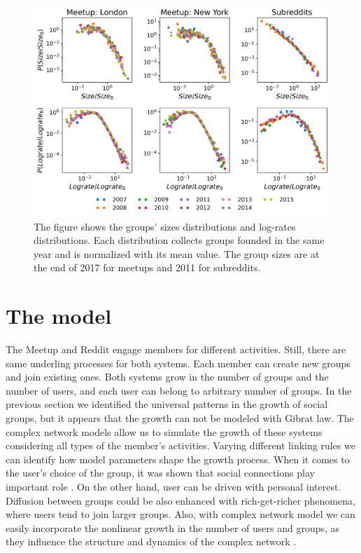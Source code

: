 \begin{figure}[h]
	\centering
	\includegraphics[width=0.8\linewidth]{Figures/figures/Fig1.png}
	\caption{The figure shows the groups' sizes distributions and log-rates distributions. Each distribution collects groups founded in the same year and is normalized with its mean value. The group sizes are at the end of 2017 for meetups and 2011 for subreddits.}
	\label{fig:scale}
\end{figure}

\section{The model}

The Meetup and Reddit engage members for different activities. Still, there are same underling processes for both systems. Each member can create new groups and join existing ones. Both systems grow in the number of groups and the number of users, and each user can belong to arbitrary number of groups. In the previous section we identified the universal patterns in the growth of social groups, but it appears that the growth can not be modeled with Gibrat law. The complex network models allow us to simulate the growth of these systems considering all types of the member's activities. Varying different linking rules we can identify how model parameters shape the growth process. When it comes to the user's choice of the group, it was shown that social connections play important role \cite{kairam2012life, zheleva2009co}. On the other hand, user can be driven with personal interest. Diffusion between groups could be also enhanced with rich-get-richer phenomena, where users tend to join larger groups. Also, with complex network model we can easily incorporate the nonlinear growth in the number of users and groups, as they influence the structure and dynamics of the complex network \cite{mitrovic2011quantitative, dankulov2015dynamics, vranic2021growth}.


